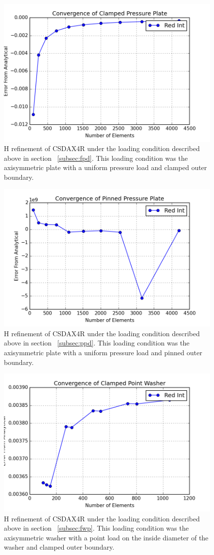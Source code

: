 \documentclass[10pt,letterpaper]{report}
\numberwithin{equation}{chapter}
\begin{document}
\begin{figure}[H]
\centering
\includegraphics[width=0.7\linewidth]{./GoodImages/Conv_PlPrCl_3}
\caption[H refinement of CSDAX4R]{H refinement of CSDAX4R under the loading condition described above in section ~\ref{subsec:fpd}. This loading condition was the axisymmetric plate with a uniform pressure load and clamped outer boundary.}
\label{fig:Conv_PlPoCl_3}
\end{figure}

\begin{figure}[H]
\centering
\includegraphics[width=0.7\linewidth]{./GoodImages/Conv_PlPrPi_3}
\caption[H refinement of CSDAX4R]{H refinement of CSDAX4R under the loading condition described above in section ~\ref{subsec:ppd}. This loading condition was the axisymmetric plate with a uniform pressure load and pinned outer boundary.}
\label{fig:Conv_PlPoCl_3}
\end{figure}

\begin{figure}[H]
\centering
\includegraphics[width=0.7\linewidth]{./GoodImages/Conv_WaPoCl_3}
\caption[H refinement of CSDAX4R]{H refinement of CSDAX4R under the loading condition described above in section ~\ref{subsec:fwp}. This loading condition was the axisymmetric washer with a point load on the inside diameter of the washer and clamped outer boundary.}
\label{fig:Conv_PlPoCl_3}
\end{figure}
\end{document}
